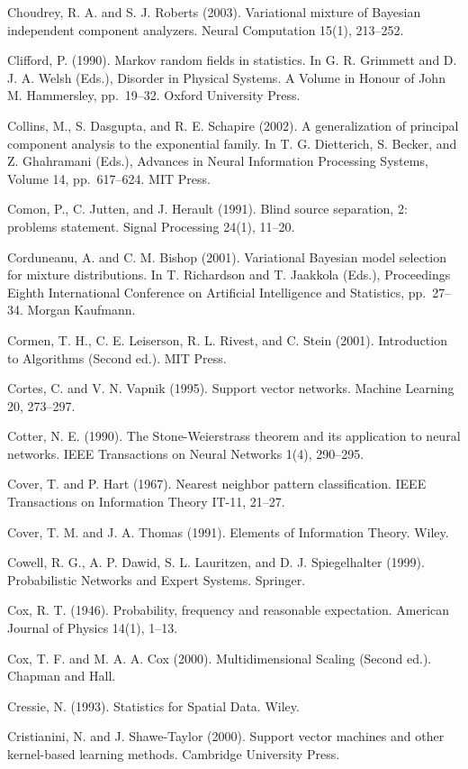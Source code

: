 \documentclass[
  10
]{article}
\begin{document}
Choudrey, R. A. and S. J. Roberts (2003). Variational mixture of
Bayesian independent component analyzers. Neural Computation 15(1),
213--252.

Clifford, P. (1990). Markov random fields in statistics. In G. R.
Grimmett and D. J. A. Welsh (Eds.), Disorder in Physical Systems. A
Volume in Honour of John M. Hammersley, pp.~19--32. Oxford University
Press.

Collins, M., S. Dasgupta, and R. E. Schapire (2002). A generalization of
principal component analysis to the exponential family. In T. G.
Dietterich, S. Becker, and Z. Ghahramani (Eds.), Advances in Neural
Information Processing Systems, Volume 14, pp.~617--624. MIT Press.

Comon, P., C. Jutten, and J. Herault (1991). Blind source separation, 2:
problems statement. Signal Processing 24(1), 11--20.

Corduneanu, A. and C. M. Bishop (2001). Variational Bayesian model
selection for mixture distributions. In T. Richardson and T. Jaakkola
(Eds.), Proceedings Eighth International Conference on Artificial
Intelligence and Statistics, pp.~27--34. Morgan Kaufmann.

Cormen, T. H., C. E. Leiserson, R. L. Rivest, and C. Stein (2001).
Introduction to Algorithms (Second ed.). MIT Press.

Cortes, C. and V. N. Vapnik (1995). Support vector networks. Machine
Learning 20, 273--297.

Cotter, N. E. (1990). The Stone-Weierstrass theorem and its application
to neural networks. IEEE Transactions on Neural Networks 1(4), 290--295.

Cover, T. and P. Hart (1967). Nearest neighbor pattern classification.
IEEE Transactions on Information Theory IT-11, 21--27.

Cover, T. M. and J. A. Thomas (1991). Elements of Information Theory.
Wiley.

Cowell, R. G., A. P. Dawid, S. L. Lauritzen, and D. J. Spiegelhalter
(1999). Probabilistic Networks and Expert Systems. Springer.

Cox, R. T. (1946). Probability, frequency and reasonable expectation.
American Journal of Physics 14(1), 1--13.

Cox, T. F. and M. A. A. Cox (2000). Multidimensional Scaling (Second
ed.). Chapman and Hall.

Cressie, N. (1993). Statistics for Spatial Data. Wiley.

Cristianini, N. and J. Shawe-Taylor (2000). Support vector machines and
other kernel-based learning methods. Cambridge University Press.
\end{document}
